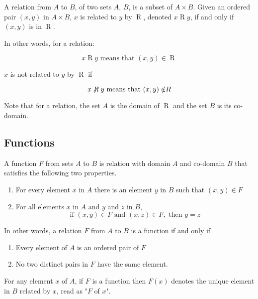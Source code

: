 \documentclass[11pt]{article}
\newcommand\rel{\mathrel{R}}
\newcommand\nrel{\not \mathrel{R}}
\begin{document}


\begin{definition}[Relation]\label{def:relation}
    A relation from $A$ to $B$, of two sets $A$, $B$, is a subset of $A \times B$.
    Given an ordered pair $(x, y)$ in $A \times B$, $x$ is related to $y$ by $\rel$,
    denoted $x \rel y$, if and only if $(x, y)$ is in $\rel$. 
    
    In other words, for a relation:

    \begin{equation*}
        x \rel y \text{ means that } (x,y) \in \rel
    \end{equation*}

    $x$ is not related to $y$ by $\mathrel{R}$ if 

    \begin{equation*}
        x \nrel y \text { means that } (x,y) \notin \rel
    \end{equation*}

    Note that for a relation, the set $A$ is the domain of
    $\rel$ and the set $B$ is its co-domain.
    
\end{definition}

\subsection{Functions}

\begin{definition}[Functions]\label{def:function}
    A function $F$ from sets $A$ to $B$ is relation with domain $A$ and co-domain $B$
    that satisfies the following two properties.
    
    \begin{enumerate}
        \item For every element $x$ in $A$ there is an element $y$ in $B$ such that $(x,y) \in F$
        \item For all elements $x$ in $A$ and $y$ and $z$ in $B$,
            \begin{equation*}
                \text{if } (x,y) \in F \text{ and } (x,z) \in F, \text{ then } y = z
            \end{equation*}
    \end{enumerate}

    In other words, a relation $F$ from $A$ to $B$ is a function if and only if
    \begin{enumerate}
        \item Every element of $A$ is an ordered pair of $F$
        \item No two distinct pairs in $F$ have the same element.
    \end{enumerate}
    
    For any element $x$ of $A$, if $F$ is a function then $F(x)$ denotes
    the unique element in $B$ related by $x$, read as "$F$ of $x$".
\end{definition}
\end{document}
